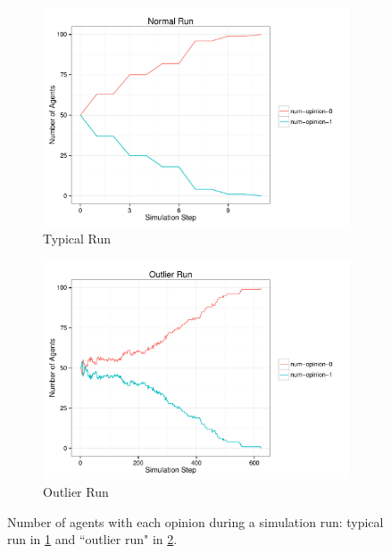 \documentclass[preprint,number]{elsarticle}
\begin{document}
      \begin{figure}[H]
        \centering
	\begin{subfigure}{.49\linewidth}
          \centering
          \includegraphics[width=1\linewidth]{"../analysis/pdf/context_permeability_simrun_kregular_k10_normal"}
          \caption{Typical Run}
          \label{fig:ctx_perm_kreg_run_normal}
	\end{subfigure}%
	\begin{subfigure}{.49\linewidth}
          \centering
          \includegraphics[width=1\linewidth]{"../analysis/pdf/context_permeability_simrun_kregular_k10_outlier"}
          \caption{Outlier Run}
          \label{fig:ctx_perm_kreg_run_outlier}
	\end{subfigure}
	
	\begin{minipage}{0.9\linewidth}
          \vspace{0.2cm}
          \caption{Number of agents with each opinion during a simulation run: typical run in
            \ref{fig:ctx_perm_kreg_run_normal} and ``outlier run" in
            \ref{fig:ctx_perm_kreg_run_outlier}.}
		\label{fig:ctx_perm_kreg_runs}
              \end{minipage}
      \end{figure}
\end{document}
